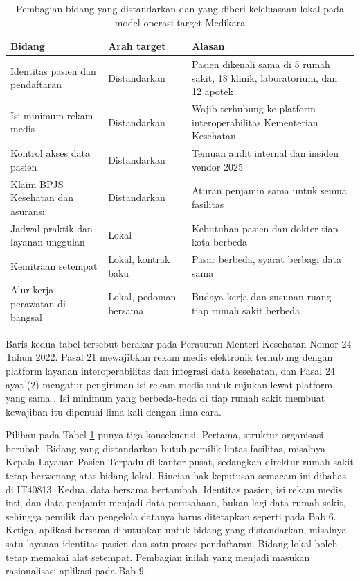 \begin{table}[!htb]
  \centering
  \caption{Pembagian bidang yang distandarkan dan yang diberi keleluasaan lokal pada model
           operasi target Medikara}
  \label{tab:ch08-standar-lokal}
  \begin{tabularx}{\textwidth}{>{\raggedright\arraybackslash}p{3.9cm}>{\raggedright\arraybackslash}p{2.3cm}>{\raggedright\arraybackslash}X}
    \hline
    \textbf{Bidang} & \textbf{Arah target} & \textbf{Alasan} \\
    \hline
    Identitas pasien dan pendaftaran & Distandarkan & Pasien dikenali sama di 5 rumah
      sakit, 18 klinik, laboratorium, dan 12 apotek \\
    \hline
    Isi minimum rekam medis & Distandarkan & Wajib terhubung ke platform interoperabilitas
      Kementerian Kesehatan \\
    \hline
    Kontrol akses data pasien & Distandarkan & Temuan audit internal dan insiden vendor 2025 \\
    \hline
    Klaim BPJS Kesehatan dan asuransi & Distandarkan & Aturan penjamin sama untuk semua
      fasilitas \\
    \hline
    Jadwal praktik dan layanan unggulan & Lokal & Kebutuhan pasien dan dokter tiap kota
      berbeda \\
    \hline
    Kemitraan setempat & Lokal, kontrak baku & Pasar berbeda, syarat berbagi data sama \\
    \hline
    Alur kerja perawatan di bangsal & Lokal, pedoman bersama & Budaya kerja dan susunan
      ruang tiap rumah sakit berbeda \\
    \hline
  \end{tabularx}
\end{table}

Baris kedua tabel tersebut berakar pada Peraturan Menteri Kesehatan Nomor 24 Tahun 2022.
Pasal 21 mewajibkan rekam medis elektronik terhubung dengan platform layanan
interoperabilitas dan integrasi data kesehatan, dan Pasal 24 ayat (2) mengatur pengiriman
isi rekam medis untuk rujukan lewat platform yang sama \cite{permenkes24-2022}. Isi minimum
yang berbeda-beda di tiap rumah sakit membuat kewajiban itu dipenuhi lima kali dengan lima
cara.

Pilihan pada Tabel \ref{tab:ch08-standar-lokal} punya tiga konsekuensi. Pertama, struktur
organisasi berubah. Bidang yang distandarkan butuh pemilik lintas fasilitas, misalnya
Kepala Layanan Pasien Terpadu di kantor pusat, sedangkan direktur rumah sakit tetap
berwenang atas bidang lokal. Rincian hak keputusan semacam ini dibahas di IT40813. Kedua,
data bersama bertambah. Identitas pasien, isi rekam medis inti, dan data penjamin menjadi
data perusahaan, bukan lagi data rumah sakit, sehingga pemilik dan pengelola datanya harus
ditetapkan seperti pada Bab 6. Ketiga, aplikasi bersama dibutuhkan untuk bidang yang
distandarkan, misalnya satu layanan identitas pasien dan satu proses pendaftaran. Bidang
lokal boleh tetap memakai alat setempat. Pembagian inilah yang menjadi masukan rasionalisasi
aplikasi pada Bab 9.

